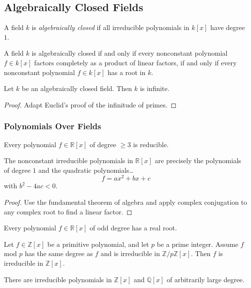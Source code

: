 \subsection{Algebraically Closed Fields}\label{algebraicallyclosedfields}
A field $k$ is \emph{algebraically closed} if all irreducible polynomials in $k[x]$ have degree $1$.

\begin{lemma}
A field $k$ is algebraically closed if and only if every nonconstant polynomial $f \in k[x]$ factors completely as a product of linear factors, if and only if
every nonconstant polynomial $f \in k[x]$ has a root in $k$.
\end{lemma}

\begin{proposition}
Let $k$ be an algebraically closed field. Then $k$ is infinite.
\end{proposition}

\begin{proof}
Adapt Euclid's proof of the infinitude of primes.
\end{proof}

\subsubsection{Polynomials Over Fields}

\begin{proposition}
Every polynomial $f \in \mathbb{R}[x]$ of degree $\geq 3$ is reducible.

The nonconstant irreducible polynomials in $\mathbb{R}[x]$ are precisely the polynomials
of degree $1$ and the quadratic polynomials\dots
$$f = ax^2 + bx + c$$
with $b^2 - 4ac < 0$.
\end{proposition}

\begin{proof}
Use the fundamental theorem of algebra and apply complex conjugation to any complex root to find a linear factor.
\end{proof}

\begin{corollary}
Every polynomial $f \in \mathbb{R}[x]$ of odd degree has a real root.
\end{corollary}

\begin{proposition}
Let $f \in \mathbb{Z}[x]$ be a primitive polynomial, and let $p$ be a prime integer. Assume $f$ mod $p$
has the same degree as $f$ and is irreducible in $\mathbb{Z}/p\mathbb{Z}[x]$. Then $f$ is irreducible in $\mathbb{Z}[x]$.
\end{proposition}

\begin{corollary}
There are irreducible polynomials in $\mathbb{Z}[x]$ and $\mathbb{Q}[x]$ of arbitrarily large degree.
\end{corollary}